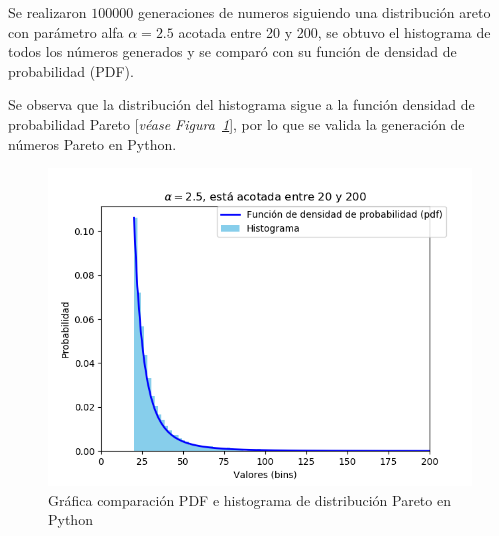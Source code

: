 Se realizaron $100000$ generaciones de numeros siguiendo una distribución areto con parámetro alfa  $\alpha =2.5$ acotada entre 20 y 200, se obtuvo el histograma de todos los números generados y se comparó con su función de densidad de probabilidad (PDF).\newline

Se observa que la distribución del histograma sigue a la función densidad de probabilidad Pareto [\textit{véase Figura~\ref{fig:generacionPareto}}], por lo que se valida la generación de números Pareto en Python.\newline

\begin{figure}[th]
    \centering
    \includegraphics[scale=.7]{Figures/ParetoDIstribution}
    \decoRule
    \caption[Gráfica comparación PDF e histograma de distribución Pareto en Python]{Gráfica comparación PDF e histograma de distribución Pareto en Python}
    \label{fig:generacionPareto}
\end{figure}

